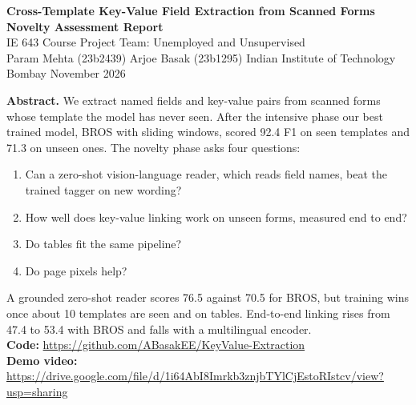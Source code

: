 \documentclass[10pt,a4paper]{article}
\begin{document}
\begin{center}
{\Large\bfseries Cross-Template Key-Value Field Extraction from Scanned Forms}\\[2pt]
{\large\bfseries Novelty Assessment Report}\\[2pt]
IE 643 Course Project \quad Team: Unemployed and Unsupervised\\[1pt]
Param Mehta (23b2439) \quad Arjoe Basak (23b1295) \quad Indian Institute of Technology Bombay  November 2026
\end{center}
\vspace{-4pt}
\begin{center}\begin{minipage}{0.95\linewidth}\small
\textbf{Abstract.} We extract named fields and key-value pairs from scanned forms whose template the model has never seen. After the intensive phase our best trained model, BROS with sliding windows, scored 92.4 F1 on seen templates and 71.3 on unseen ones. The novelty phase asks four questions:
\begin{enumerate}[nosep,leftmargin=2em,topsep=1pt,itemsep=0pt]
\item Can a zero-shot vision-language reader, which reads field names, beat the trained tagger on new wording?
\item How well does key-value linking work on unseen forms, measured end to end?
\item Do tables fit the same pipeline?
\item Do page pixels help?
\end{enumerate}
A grounded zero-shot reader scores 76.5 against 70.5 for BROS, but training wins once about 10 templates are seen and on tables. End-to-end linking rises from 47.4 to 53.4 with BROS and falls with a multilingual encoder.\\[2pt]
\textbf{Code:} \url{https://github.com/ABasakEE/KeyValue-Extraction}\\
\textbf{Demo video:} \url{https://drive.google.com/file/d/1i64AbI8Imrkb3znjbTYlCjEstoRIstcv/view?usp=sharing}
\end{minipage}\end{center}
\end{document}
